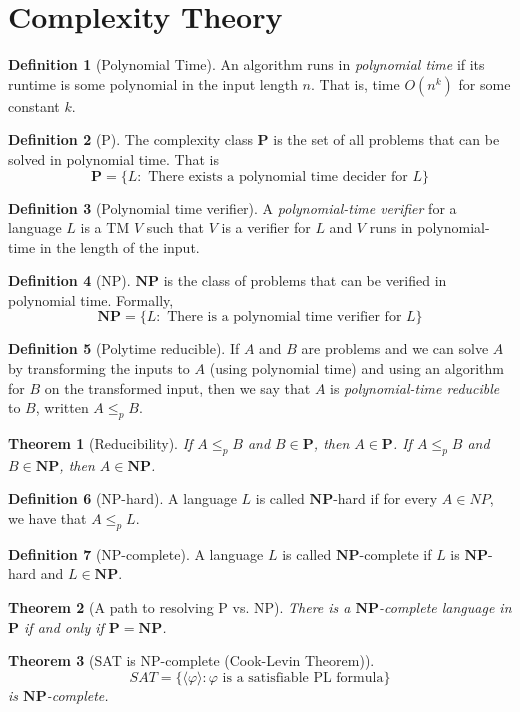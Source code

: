 \documentclass[12pt]{article}
\newtheorem{theorem}{Theorem}[section]
\theoremstyle{definition}
\newtheorem{definition}{Definition}[section]
\begin{document}
\section{Complexity Theory}
\begin{definition}[Polynomial Time]
    An algorithm runs in \emph{polynomial time} if its runtime is some polynomial in the input length $n$. That is, time $O(n^k)$ for some constant $k$.
\end{definition}
\begin{definition}[P]
    The complexity class $\mathbf{P}$ is the set of all problems that can be solved in polynomial time. That is 
    $$\mathbf{P} = \{L : \text{ There exists a polynomial time decider for }L\}$$
\end{definition}
\begin{definition}[Polynomial time verifier]
    A \emph{polynomial-time verifier} for a language $L$ is a TM $V$ such that $V$ is a verifier for $L$ and $V$ runs in polynomial-time in the length of the input.
\end{definition}
\begin{definition}[NP]
    $\mathbf{NP}$ is the class of problems that can be verified in polynomial time. Formally, 
    $$
    \mathbf{NP} = \{L : \text{ There is a polynomial time verifier for } L \}
    $$
\end{definition}
\begin{definition}[Polytime reducible]
    If $A$ and $B$ are problems and we can solve $A$ by transforming the inputs to $A$ (using polynomial time) and using an algorithm for $B$ on the transformed input, then we say that $A$ is \emph{polynomial-time reducible} to $B$, written $A \leq_p B$.
\end{definition}

\begin{theorem}[Reducibility]
    If $A \leq_p B$ and $B \in \mathbf{P}$, then $A \in \mathbf{P}$.
    If $A \leq_p B$ and $B \in \mathbf{NP}$, then $A \in \mathbf{NP}$.
\end{theorem}

\begin{definition}[NP-hard]
    A language $L$ is called $\mathbf{NP}$-hard if for every $A \in NP$, we have that $A \leq_p L$.
\end{definition}
\begin{definition}[NP-complete]
    A language $L$ is called $\mathbf{NP}$-complete if $L$ is $\mathbf{NP}$-hard and $L \in \mathbf{NP}$.
\end{definition}
\begin{theorem}[A path to resolving P vs. NP]
    There is a $\mathbf{NP}$-complete language in $\mathbf{P}$ if and only if $\mathbf{P} = \mathbf{NP}$.
\end{theorem}
\begin{theorem}[SAT is NP-complete (Cook-Levin Theorem)]
    $$SAT = \{\langle \varphi \rangle : \varphi \text{ is a satisfiable PL formula}\}$$ is $\mathbf{NP}$-complete.
\end{theorem}
\end{document}
